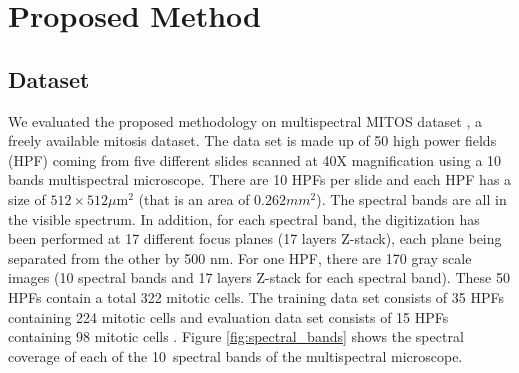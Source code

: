 \documentclass[10pt,twocolumn,letterpaper]{article}
\begin{document}
\section{Proposed Method}
\label{sec:framework}
\subsection{Dataset}

We evaluated the proposed methodology on multispectral MITOS dataset \cite{mITOS2012}, a freely available mitosis dataset. The data set is made up of 50 high power fields (HPF) coming from five different slides scanned at 40X magnification using a 10 bands multispectral microscope. There are 10 HPFs per slide and each HPF has a size of $512\times512\mu\text{m}^2$ (that is an area of $0.262mm^2$). The spectral bands are all in the visible spectrum. In addition, for each spectral band, the digitization has been performed at 17 different focus planes (17 layers Z-stack), each plane being separated from the other by 500 nm. For one HPF, there are 170 gray scale images (10 spectral bands and 17 layers Z-stack for each spectral band). These 50 HPFs contain a total 322 mitotic cells. The training data set consists of 35 HPFs containing 224 mitotic cells and evaluation data set consists of 15 HPFs containing 98 mitotic cells \cite{roux2013}. Figure \ref{fig:spectral_bands} shows the spectral coverage of each of the 10~spectral bands of the multispectral microscope.
\end{document}

